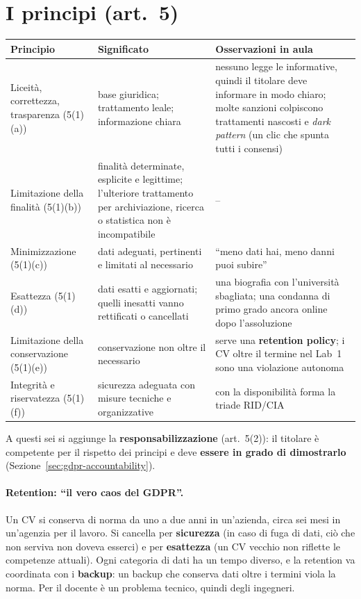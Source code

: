 \section{I principi (art.~5)}
\label{sec:gdpr-principi}

\begin{center}
\small
\begin{tabularx}{\linewidth}{>{\raggedright\arraybackslash}p{3.6cm} X X}
\toprule
\textbf{Principio} & \textbf{Significato} & \textbf{Osservazioni in aula}\\
\midrule
Liceità, correttezza, trasparenza (5(1)(a)) & base giuridica; trattamento leale; informazione chiara &
  nessuno legge le informative, quindi il titolare deve informare in modo chiaro; molte sanzioni colpiscono
  trattamenti nascosti e \emph{dark pattern} (un clic che spunta tutti i consensi)\\
Limitazione della finalità (5(1)(b)) & finalità determinate, esplicite e legittime; l'ulteriore
  trattamento per archiviazione, ricerca o statistica non è incompatibile & --\\
Minimizzazione (5(1)(c)) & dati adeguati, pertinenti e limitati al necessario & ``meno dati hai, meno
  danni puoi subire''\\
Esattezza (5(1)(d)) & dati esatti e aggiornati; quelli inesatti vanno rettificati o cancellati & una
  biografia con l'università sbagliata; una condanna di primo grado ancora online dopo l'assoluzione\\
Limitazione della conservazione (5(1)(e)) & conservazione non oltre il necessario & serve una
  \textbf{retention policy}; i CV oltre il termine nel Lab~1 sono una violazione autonoma\\
Integrità e riservatezza (5(1)(f)) & sicurezza adeguata con misure tecniche e organizzative & con la
  disponibilità forma la triade RID/CIA\\
\bottomrule
\end{tabularx}
\end{center}
A questi sei si aggiunge la \textbf{responsabilizzazione} (art.~5(2)): il titolare è competente per il
rispetto dei principi e deve \textbf{essere in grado di dimostrarlo} (Sezione~\ref{sec:gdpr-accountability}).

\paragraph{Retention: ``il vero caos del GDPR''.} Un CV si conserva di norma da uno a due anni in
un'azienda, circa sei mesi in un'agenzia per il lavoro. Si cancella per \textbf{sicurezza} (in caso di
fuga di dati, ciò che non serviva non doveva esserci) e per \textbf{esattezza} (un CV vecchio non
riflette le competenze attuali). Ogni categoria di dati ha un tempo diverso, e la retention va coordinata
con i \textbf{backup}: un backup che conserva dati oltre i termini viola la norma. Per il docente è un
problema tecnico, quindi degli ingegneri.

